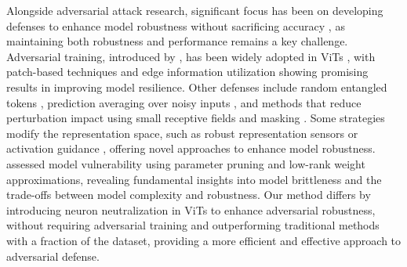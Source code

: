 Alongside adversarial attack research, significant focus has been on developing defenses to enhance model robustness without sacrificing accuracy \cite{li2023trade}, as maintaining both robustness and performance remains a key challenge. Adversarial training, introduced by \cite{goodfellow2014explaining}, has been widely adopted in ViTs \cite{mo2022adversarial, fu2022patch}, with patch-based techniques \cite{liu2023understanding} and edge information utilization \cite{li2024harnessing} showing promising results in improving model resilience. Other defenses include random entangled tokens \cite{gong2024random}, prediction averaging over noisy inputs \cite{cohen2019certified}, and methods that reduce perturbation impact using small receptive fields and masking \cite{xiang2021patchguard}. Some strategies modify the representation space, such as robust representation sensors \cite{zhang2024towards} or activation guidance \cite{turner2023activation, liu2023context}, offering novel approaches to enhance model robustness. \cite{wei2024assessing} assessed model vulnerability using parameter pruning and low-rank weight approximations, revealing fundamental insights into model brittleness and the trade-offs between model complexity and robustness. Our method differs by introducing neuron neutralization in ViTs to enhance adversarial robustness, without requiring adversarial training and outperforming traditional methods with a fraction of the dataset, providing a more efficient and effective approach to adversarial defense.